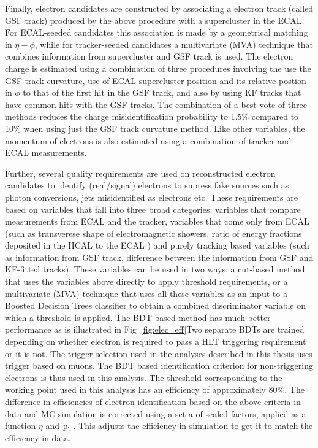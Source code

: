 Finally, electron candidates are constructed by associating a electron track (called GSF track) produced by the above procedure with a supercluster in the ECAL. For ECAL-seeded candidates this association is made by a geometrical matching in $\eta-\phi$, while for tracker-seeded candidates a multivariate (MVA) technique that combines information from supercluster and GSF track is used. The electron charge is estimated using a combination of three procedures involving the use the GSF track curvature, use of ECAL supercluster position and its relative postion in $\phi$ to that of the first hit in the GSF track, and also by using KF tracks that have common hits with the GSF tracks. The combination of a best vote of three methods reduces the charge misidentification probability to 1.5\%  compared to 10\% when using just the GSF track curvature method. Like other variables, the momentum of electrons is also estimated using a combination of tracker and ECAL measurements.


Further, several quality requirements are used on reconstructed electron candidates to identify (real/signal) electrons to supress fake sources such as photon conversions, jets misidentified as electrons etc.
These requirements are based on variables that fall into three broad categories: variables that compare measurements from ECAL and the tracker, variables that come only from ECAL (such as transverese shape of electromagnetic showers, ratio of energy fractions deposited in the HCAL to the ECAL ) and purely tracking based variables (such as information from GSF track, difference between the information from GSF and KF-fitted tracks). These variables can be used in two ways: a cut-based method that uses the variables above directly to apply threshold requirements, or a multivariate (MVA) technique that uses all these variables as an input to a Boosted Decision Trees classifier to obtain a combined discriminator variable on which a threshold is applied. The BDT based method has much better performance as is illustrated in Fig~\ref{fig:elec_eff}Two separate BDTs are trained depending on whether electron is required to pass a HLT triggering requirement or it is not. The trigger selection used in the analyses described in this thesis uses trigger based on muons. The BDT based identification criterion for non-triggering electrons is thus used in this analysis. The threshold corresponding to the working point used in this analysis has an efficiency of approximately 80\%. The difference in efficiencies  of electron identification based on the above criteria in data and MC simulation is corrected using a set a of scaled factors, applied as a function $\eta$ and $\text{p}_\text{T}$. This adjusts the efficiency in simulation to get it to match the efficiency in data.  
   

